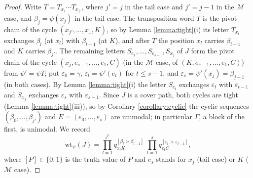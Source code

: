 \documentclass{amsart}
\theoremstyle{definition}
\theoremstyle{remark}
\numberwithin{equation}{section}
\begin{document}
\begin{proof}
Write $T=T_{x_1}\cdots T_{x_{j'}}$, where $j'=j$ in the tail case and $j'=j-1$ in the $\mathcal M$ case, and $\beta_j=\psi(x_j)$ in the tail case. The transposition word $T$ is the pivot chain of the cycle $(x_{j'},\ldots,x_1,K)$, so by Lemma \ref{lemma:tight}(i) its letter $T_{x_l}$ exchanges $\beta_l$ (at $x_l$) with $\beta_{l-1}$ (at $K$), and after $T$ the position $x_l$ carries $\beta_{l-1}$ and $K$ carries $\beta_{j'}$. The remaining letters $S_{e_1},\ldots,S_{e_{s-1}},S_{x_j}$ of $J$ form the pivot chain of the cycle $(x_j,e_{s-1},\ldots,e_1,C)$ (in the $\mathcal M$ case, of $(K,e_{s-1},\ldots,e_1,C)$) from $\psi'=\psi T$; put $\varepsilon_0=\gamma$, $\varepsilon_t=\psi'(e_t)$ for $t\leq s-1$, and $\varepsilon_s=\psi'(x_j)=\beta_{j-1}$ (in both cases). By Lemma \ref{lemma:tight}(i) the letter $S_{e_t}$ exchanges $\varepsilon_t$ with $\varepsilon_{t-1}$ and $S_{x_j}$ exchanges $\varepsilon_s$ with $\varepsilon_{s-1}$. Since $J$ is a cover path, both cycles are tight (Lemma \ref{lemma:tight}(iii)), so by Corollary \ref{corollary:cyclic} the cyclic sequences $(\beta_0,\ldots,\beta_{j'})$ and $E=(\varepsilon_0,\ldots,\varepsilon_s)$ are unimodal; in particular $\Gamma$, a block of the first, is unimodal. We record
\begin{equation}\label{eq:wtJ}
\mathrm{wt}_\psi(J)=\prod_{l=1}^{j'}q_{x_lK}^{[\beta_l>\beta_{l-1}]}\ \prod_{t=1}^{s}q_{e_tC}^{[\varepsilon_t>\varepsilon_{t-1}]},
\end{equation}
where $[P]\in\{0,1\}$ is the truth value of $P$ and $e_s$ stands for $x_j$ (tail case) or $K$ ($\mathcal M$ case).


\end{proof}
\end{document}
